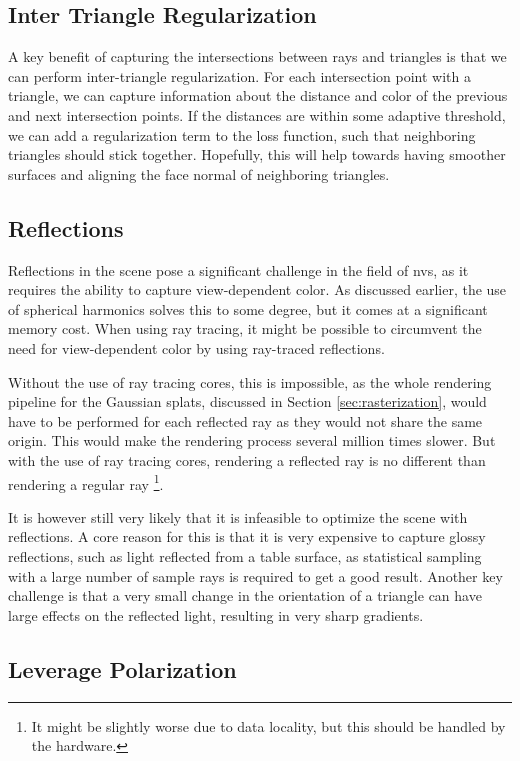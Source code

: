 \subsection{Inter Triangle Regularization}
A key benefit of capturing the intersections between rays and triangles is that we can perform inter-triangle regularization.
For each intersection point with a triangle, we can capture information about the distance and color of the previous and next intersection points.
If the distances are within some adaptive threshold, we can add a regularization term to the loss function, such that neighboring triangles should stick together.
Hopefully, this will help towards having smoother surfaces and aligning the face normal of neighboring triangles.

\subsection{Reflections}
Reflections in the scene pose a significant challenge in the field of \gls{nvs}, as it requires the ability to capture view-dependent color.
As discussed earlier, the use of spherical harmonics solves this to some degree, but it comes at a significant memory cost.
When using ray tracing, it might be possible to circumvent the need for view-dependent color by using ray-traced reflections.

Without the use of ray tracing cores, this is impossible, as the whole rendering pipeline for the Gaussian splats, discussed in Section \ref{sec:rasterization}, would have to be performed for each reflected ray as they would not share the same origin.
This would make the rendering process several million times slower.
But with the use of ray tracing cores, rendering a reflected ray is no different than rendering a regular ray \footnote{It might be slightly worse due to data locality, but this should be handled by the hardware.}.

It is however still very likely that it is infeasible to optimize the scene with reflections.
A core reason for this is that it is very expensive to capture glossy reflections, such as light reflected from a table surface, as statistical sampling with a large number of sample rays is required to get a good result.
Another key challenge is that a very small change in the orientation of a triangle can have large effects on the reflected light, resulting in very sharp gradients.


\subsection{Leverage Polarization}

